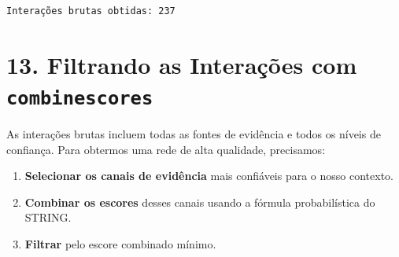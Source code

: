 \documentclass[
  letterpaper,
  DIV=11,
  numbers=noendperiod]{scrreprt}
\newenvironment{Shaded}{\begin{snugshade}}{\end{snugshade}}
\newcommand{\AttributeTok}[1]{\textcolor[rgb]{0.40,0.45,0.13}{#1}}
\newcommand{\CommentTok}[1]{\textcolor[rgb]{0.37,0.37,0.37}{#1}}
\newcommand{\ConstantTok}[1]{\textcolor[rgb]{0.56,0.35,0.01}{#1}}
\newcommand{\FunctionTok}[1]{\textcolor[rgb]{0.28,0.35,0.67}{#1}}
\newcommand{\NormalTok}[1]{\textcolor[rgb]{0.00,0.23,0.31}{#1}}
\newcommand{\OtherTok}[1]{\textcolor[rgb]{0.00,0.23,0.31}{#1}}
\newcommand{\SpecialCharTok}[1]{\textcolor[rgb]{0.37,0.37,0.37}{#1}}
\newcommand{\StringTok}[1]{\textcolor[rgb]{0.13,0.47,0.30}{#1}}
\providecommand{\tightlist}{%
  \setlength{\itemsep}{0pt}\setlength{\parskip}{0pt}}
\begin{document}
\begin{Shaded}
\end{Shaded}

\begin{verbatim}
Interações brutas obtidas: 237 
\end{verbatim}

\section{\texorpdfstring{13. Filtrando as Interações com
\texttt{combinescores}}{13. Filtrando as Interações com combinescores}}\label{filtrando-as-interauxe7uxf5es-com-combinescores}

As interações brutas incluem todas as fontes de evidência e todos os
níveis de confiança. Para obtermos uma rede de alta qualidade,
precisamos:

\begin{enumerate}
\def\labelenumi{\arabic{enumi}.}
\tightlist
\item
  \textbf{Selecionar os canais de evidência} mais confiáveis para o
  nosso contexto.
\item
  \textbf{Combinar os escores} desses canais usando a fórmula
  probabilística do STRING.
\item
  \textbf{Filtrar} pelo escore combinado mínimo.
\end{enumerate}
\end{document}
